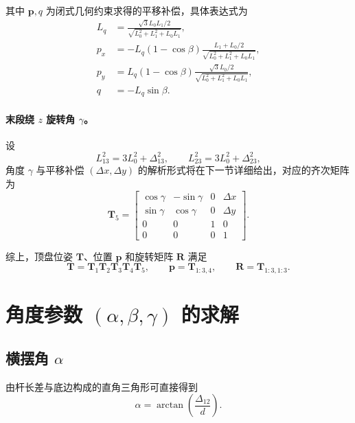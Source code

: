 \documentclass[12pt,a4paper]{article}
\begin{document}
其中 $\bm p, q$ 为闭式几何约束求得的平移补偿，具体表达式为
\begin{align}
  L_q &= \frac{\sqrt{3}L_0 L_1/2}{\sqrt{L_0^2 + L_1^2 + L_0 L_1}},\\
  p_x &= -L_q (1-\cos\beta) \frac{L_1 + L_0 / 2}{\sqrt{L_0^2 + L_1^2 + L_0 L_1}},\\
  p_y &= L_q (1-\cos\beta) \frac{\sqrt{3} L_0 / 2}{\sqrt{L_0^2 + L_1^2 + L_0 L_1}},\\
  q &= - L_q \sin\beta.
\end{align}

\paragraph{末段绕 $z$ 旋转角 $\gamma$。} 
设
\begin{equation}
  L_{13}^2 = 3L_0^2 + \Delta_{13}^2,\qquad L_{23}^2 = 3L_0^2 + \Delta_{23}^2,
\end{equation}
角度 $\gamma$ 与平移补偿 $(\Delta x, \Delta y)$ 的解析形式将在下一节详细给出，对应的齐次矩阵为
\begin{equation}
  \bm T_5 = \begin{bmatrix}
    \cos\gamma & -\sin\gamma & 0 & \Delta x\\
    \sin\gamma & \cos\gamma & 0 & \Delta y\\
    0 & 0 & 1 & 0\\
    0 & 0 & 0 & 1
  \end{bmatrix}.
\end{equation}

综上，顶盘位姿 $\bm T$、位置 $\bm p$ 和旋转矩阵 $\bm R$ 满足
\begin{equation}
  \bm T = \bm T_1\bm T_2\bm T_3\bm T_4\bm T_5,\qquad
  \bm p = \bm T_{1:3,4},\qquad \bm R = \bm T_{1:3,1:3}.
\end{equation}

\section{角度参数 \texorpdfstring{$(\alpha,\beta,\gamma)$}{(alpha,beta,gamma)} 的求解}
\subsection{横摆角 $\alpha$}
由杆长差与底边构成的直角三角形可直接得到
\begin{equation}
  \alpha = \arctan\left(\frac{\Delta_{12}}{d}\right).
\end{equation}
\end{document}
